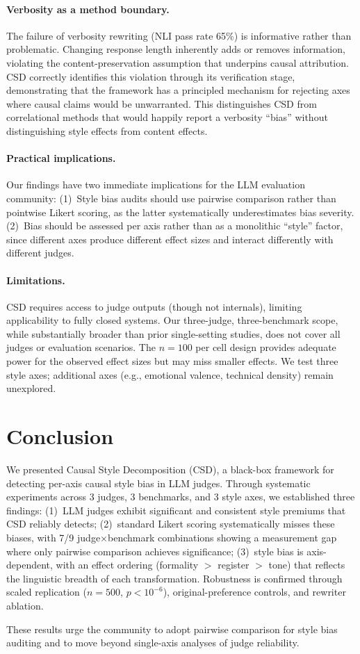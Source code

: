 \documentclass[11pt,a4paper]{article}
\begin{document}
\paragraph{Verbosity as a method boundary.}
The failure of verbosity rewriting (NLI pass rate 65\%) is informative rather than problematic.
Changing response length inherently adds or removes information, violating the content-preservation assumption that underpins causal attribution.
CSD correctly identifies this violation through its verification stage, demonstrating that the framework has a principled mechanism for rejecting axes where causal claims would be unwarranted.
This distinguishes CSD from correlational methods that would happily report a verbosity ``bias'' without distinguishing style effects from content effects.

\paragraph{Practical implications.}
Our findings have two immediate implications for the LLM evaluation community:
(1)~Style bias audits should use pairwise comparison rather than pointwise Likert scoring, as the latter systematically underestimates bias severity.
(2)~Bias should be assessed per axis rather than as a monolithic ``style'' factor, since different axes produce different effect sizes and interact differently with different judges.

\paragraph{Limitations.}
CSD requires access to judge outputs (though not internals), limiting applicability to fully closed systems.
Our three-judge, three-benchmark scope, while substantially broader than prior single-setting studies, does not cover all judges or evaluation scenarios.
The $n=100$ per cell design provides adequate power for the observed effect sizes but may miss smaller effects.
We test three style axes; additional axes (e.g., emotional valence, technical density) remain unexplored.

\section{Conclusion}

We presented Causal Style Decomposition (CSD), a black-box framework for detecting per-axis causal style bias in LLM judges.
Through systematic experiments across 3 judges, 3 benchmarks, and 3 style axes, we established three findings:
(1)~LLM judges exhibit significant and consistent style premiums that CSD reliably detects;
(2)~standard Likert scoring systematically misses these biases, with 7/9 judge$\times$benchmark combinations showing a measurement gap where only pairwise comparison achieves significance;
(3)~style bias is axis-dependent, with an effect ordering (formality $>$ register $>$ tone) that reflects the linguistic breadth of each transformation.
Robustness is confirmed through scaled replication ($n=500$, $p<10^{-6}$), original-preference controls, and rewriter ablation.

These results urge the community to adopt pairwise comparison for style bias auditing and to move beyond single-axis analyses of judge reliability.
\end{document}
